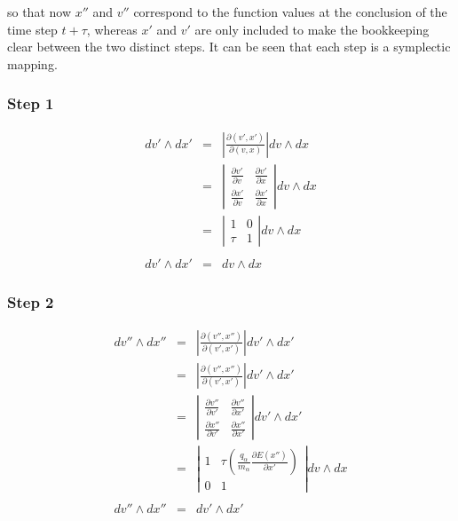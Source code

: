 \documentclass[11pt,titlepage]{report}
\begin{document}
\noindent so that now $x''$ and $v''$ correspond to the function values at the conclusion of the time step $t + \tau$, whereas $x'$ and $v'$ are only included to make the bookkeeping clear between the two distinct steps. It can be seen that each step is a symplectic mapping.

\subsubsection{Step 1}

\begin{eqnarray*}
dv' \wedge dx' & = &  \left|\frac{\partial (v',x')}{\partial(v,x)}\right| dv \wedge dx \\[0.7em]
& = & \left| \begin{array}{cc}
\frac{\partial v'}{\partial v} & \frac{\partial v'}{\partial x}  \\[0.7em]
\frac{\partial x'}{\partial v} & \frac{\partial x'}{\partial x} \end{array}\right| dv \wedge dx \\[0.7em]
& = & \left| \begin{array}{cc}
1 & 0  \\[0.7em]
\tau & 1 \end{array}\right| dv \wedge dx \\[0.7em]
&&  \\[0.7em]
dv' \wedge dx' & = & dv \wedge dx \end{eqnarray*}

\subsubsection{Step 2}

\begin{eqnarray*}
dv'' \wedge dx'' & = & \left|\frac{\partial (v'',x'')}{\partial(v',x')}\right| dv' \wedge dx'\\[0.7em]
& = & \left|\frac{\partial (v'',x'')}{\partial(v',x')}\right| dv' \wedge dx' \\[0.7em]
& = &  \left| \begin{array}{cc}
\frac{\partial v''}{\partial v'} & \frac{\partial v''}{\partial x'}  \\[0.7em]
\frac{\partial x''}{\partial v'} & \frac{\partial x''}{\partial x'} \end{array}\right| dv' \wedge dx' \\[0.7em]
& = & \left| \begin{array}{cc}
1 & \tau \left(\frac{q_{\alpha}}{m_{\alpha}}\frac{\partial E(x'') }{\partial x'}\right)  \\[0.7em]
0 & 1 \end{array}\right| dv \wedge dx \\[0.5em]
&&  \\[0.7em]
dv'' \wedge dx'' & = & dv' \wedge dx' \end{eqnarray*}
\end{document}
